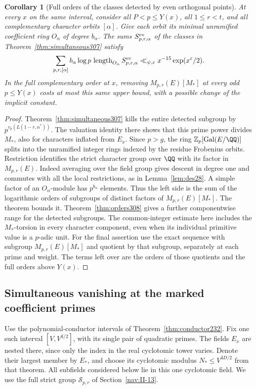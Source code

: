 \documentclass[a4paper,11pt]{article}
\newtheorem{corollary}[proposition]{Corollary}
\theoremstyle{definition}
\theoremstyle{remark}
\newcommand{\ZZ}{\mathbb Z}\newcommand{\ord}{\operatorname{ord}}
\newcommand{\len}{\operatorname{length}}\newcommand{\Res}{\operatorname*{Res}}
\numberwithin{equation}{section}
\newcommand{\Sel}{\mathcal S}
\begin{document}
\begin{corollary}[Full orders of the classes detected by even orthogonal points]
\label{cor:evenorders333}
At every \(x\) on the same interval, consider all \(P<p\le Y(x)\),
all \(1\le r<t\), and all complementary character orbits \([\alpha]\).
Give each orbit its minimal unramified coefficient ring \(O_\alpha\)
of degree \(b_\alpha\). The sums \(S^{\rm ev}_{p,r,\alpha}\) of
the classes in Theorem~\ref{thm:simultaneous307} satisfy
\[
       \sum_{p,r,[\alpha]} b_\alpha\log p\,
           \len_{O_\alpha} S^{\rm ev}_{p,r,\alpha}
         \ll_{\psi,\varepsilon} x^{-15}\exp(x^\varepsilon/2).
\]
In the full complementary order at \(x\), removing
\(M_{p,r}(E)[M_*]\) at every odd \(p\le Y(x)\) costs at most this
same upper bound, with a possible change of the implicit constant.
\end{corollary}
\begin{proof}
Theorem~\ref{thm:simultaneous307} kills the entire detected subgroup
by \(p^{v_p(L(1-r,\alpha^*))}\). The valuation identity there shows
that this prime power divides \(M_*\), also for characters inflated
from \(E_x\). Since \(p>g\), the ring
\(\ZZ_p[\operatorname{Gal}(E/\QQ)]\) splits into the unramified
integer rings indexed by the residue Frobenius orbits. Restriction
identifies the strict character group over \(\QQ\) with its factor
in \(M_{p,r}(E)\). Indeed averaging over the field group gives
descent in degree one and commutes with all the local restrictions,
as in Lemma~\ref{lem:des28}. A simple factor of an \(O_\alpha\)-module
has \(p^{b_\alpha}\) elements. Thus the left side is the sum of
the logarithmic orders of subgroups of distinct factors of
\(M_{p,r}(E)[M_*]\). The theorem bounds it.
Theorem~\ref{thm:orders308} gives a further componentwise range for
the detected subgroups. The common-integer estimate here includes
the \(M_*\)-torsion in every character component, even when its
individual primitive value is a \(p\)-adic unit.
For the final assertion use the exact sequence with subgroup
\(M_{p,r}(E)[M_*]\) and quotient by that subgroup, separately
at each prime and weight. The terms left over are the orders
of those quotients and the full orders above \(Y(x)\).
\end{proof}


\subsection{Simultaneous vanishing at the marked coefficient primes}\label{sec:markedstrict337}
Use the polynomial-conductor intervals of Theorem~\ref{thm:conductor232}.
Fix one such interval \([V,V^{3/2}]\), with its single pair of
quadratic primes. The fields \(E_x\) are nested there, since only the
index in the real cyclotomic tower varies. Denote their largest
member by \(E_*\), and choose its cyclotomic modulus \(N_*\le V^{3D/2}\)
from that theorem. All subfields considered below lie in this
one cyclotomic field. We use the full strict group
\(\Sel_{p,r}\) of Section~\ref{nav:II-13}.
\end{document}
